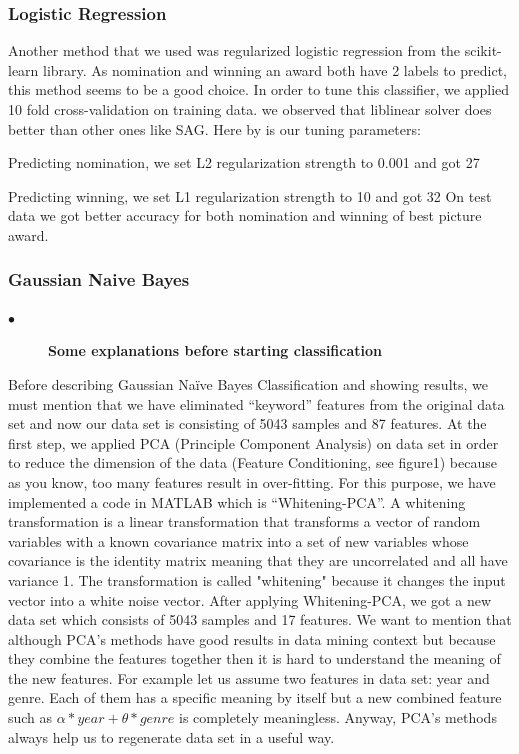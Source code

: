 \documentclass[journal,transmag]{IEEEtran}
\begin{document}
			\subsubsection{Logistic Regression}
			Another method that we used was regularized logistic regression from the scikit-learn library. As nomination and winning an award both have 2 labels to predict, this method seems to be a good choice. In order to tune this classifier, we applied 10 fold cross-validation on training data. we observed that liblinear solver does better than other ones like SAG. Here by is our tuning parameters:
			\item Predicting nomination, we set L2 regularization strength to 0.001 and got 27%
			\item Predicting winning, we set L1 regularization strength to 10 and got 32%
			On test data we got better accuracy for both nomination and winning of best picture award.
			
			
			\subsubsection{Gaussian Naive Bayes}
			\begin{description}
          \item[$\bullet$] \bf{Some explanations before starting classification}
            \end{description}	
Before describing Gaussian Naïve Bayes Classification and showing results, we must mention that we have eliminated “keyword” features from the original data set and now our data set is consisting of 5043 samples and 87 features. At the first step, we applied PCA (Principle Component Analysis) on data set in order to reduce the dimension of the data (Feature Conditioning, see figure1) because as you know, too many features result in over-fitting. For this purpose, we have implemented a code in MATLAB which is “Whitening-PCA”. A whitening transformation is a linear transformation that transforms a vector of random variables with a known covariance matrix into a set of new variables whose covariance is the identity matrix meaning that they are uncorrelated and all have variance 1\cite{refFoj}. The transformation is called "whitening" because it changes the input vector into a white noise vector. After applying Whitening-PCA, we got a new data set which consists of 5043 samples and 17 features. We want to mention that although PCA’s methods have good results in data mining context but because they combine the features together then it is hard to understand the meaning of the new features. For example let us assume two features in data set: year and genre. 
Each of them has a specific meaning by itself but a new combined feature such as $\alpha*year+\theta*genre$ is completely meaningless. Anyway, PCA’s methods always help us to regenerate data set in a useful way. 
	
\end{document}
